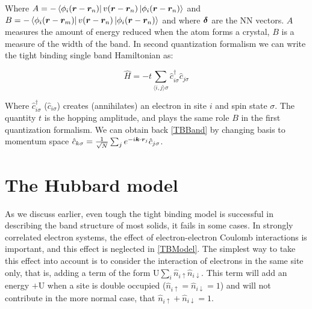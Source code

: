 Where $A = -\bra{\phi_i(\boldsymbol{r}-\boldsymbol{r}_n)}v(\boldsymbol{r}-\boldsymbol{r}_n) \ket{\phi_i(\boldsymbol{r}-\boldsymbol{r}_n)}$ and $B = -\bra{\phi_i(\boldsymbol{r}-\boldsymbol{r}_m)}v(\boldsymbol{r}-\boldsymbol{r}_n) \ket{\phi_i(\boldsymbol{r}-\boldsymbol{r}_n)}$ and where $\boldsymbol{\delta}$ are the NN vectors. $A$ measures the amount of energy reduced when the atom forms a crystal, $B$ is a measure of the width of the band.
In second quantization formalism we can write the tight binding single band Hamiltonian as:

\begin{equation}
\label{TBModel}
\hat{H} = -t\sum_{\langle i,j \rangle \sigma} \hat{c}^{\dagger}_{i\sigma}\hat{c}_{j\sigma}
\end{equation}

Where $\hat{c}^{\dagger}_{i\sigma}$ ($\hat{c}_{i\sigma}$) creates (annihilates) an electron in site $i$ and spin state $\sigma$. The quantity $t$ is the hopping amplitude, and plays the same role $B$ in the first quantization formalism. We can obtain back \ref{TBBand} by changing basis to momentum space $\hat{c}_{k\sigma} = \frac{1}{\sqrt{N}}\sum_j e^{-i\boldsymbol{k}\cdot\boldsymbol{r}_j}\hat{c}_{j\sigma}$.

\section{The Hubbard model}

As we discuss earlier, even tough the tight binding model is successful in describing the band structure of most solids, it fails in some cases. In strongly correlated electron systems, the effect of electron-electron Coulomb interactions is important, and this effect is neglected in \ref{TBModel}. The simplest way to take this effect into account is to consider the interaction of electrons in the same site only, that is, adding a term of the form $\text{U}\sum_i \hat{n}_{i\uparrow}\hat{n}_{i\downarrow}$. This term will add an energy $+\text{U}$ when a site is double occupied ($\hat{n}_{i\uparrow} = \hat{n}_{i\downarrow} = 1$) and will not contribute in the more normal case, that $\hat{n}_{i\uparrow} + \hat{n}_{i\downarrow} = 1$.




